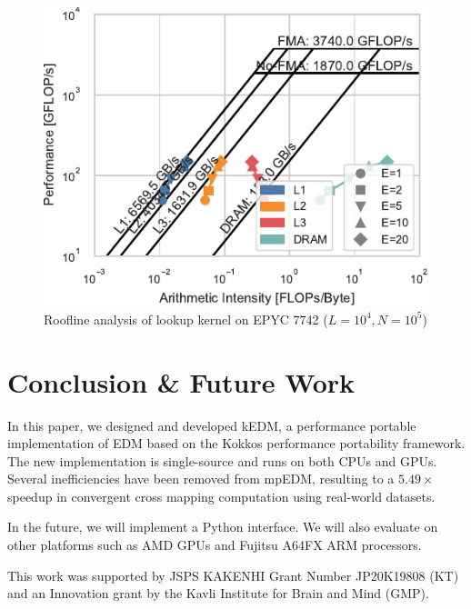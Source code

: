 \documentclass[sigconf]{acmart}
\begin{document}
\begin{figure}
    \centering
    \includegraphics{figs/roofline_lookup_wo_rho_epyc}
    \caption{Roofline analysis of lookup kernel on EPYC 7742 ($L=10^4, N=10^5$)}%
    \label{fig:roofline-lookup-eypc}
\end{figure}

\section{Conclusion \& Future Work}\label{sec:conclusion}

In this paper, we designed and developed kEDM, a performance portable
implementation of EDM based on the Kokkos performance portability framework.
The new implementation is single-source and runs on both CPUs and GPUs.
Several inefficiencies have been removed from mpEDM, resulting to a
$5.49\times$ speedup in convergent cross mapping computation using real-world
datasets.

In the future, we will implement a Python interface. We will also evaluate on
other platforms such as AMD GPUs and Fujitsu A64FX ARM processors.

\begin{acks}
This work was supported by JSPS KAKENHI Grant Number JP20K19808 (KT) and an
Innovation grant by the Kavli Institute for Brain and Mind (GMP).
\end{acks}

\clearpage



\end{document}
